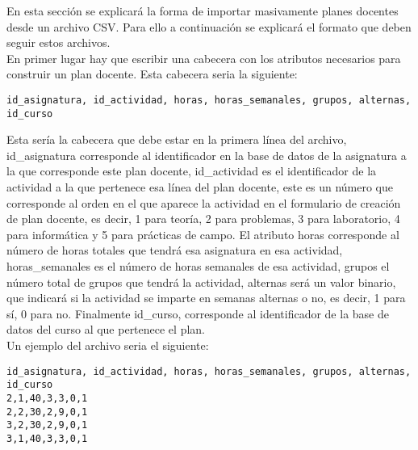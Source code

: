 En esta sección se explicará la forma de importar masivamente planes docentes desde un archivo CSV. Para ello a continuación se explicará el formato que deben seguir estos archivos.
\\
En primer lugar hay que escribir una cabecera con los atributos necesarios para construir un plan docente. Esta cabecera seria la siguiente:

\begin{verbatim}
id_asignatura, id_actividad, horas, horas_semanales, grupos, alternas, id_curso
\end{verbatim}

Esta sería la cabecera que debe estar en la primera línea del archivo, id\_asignatura corresponde al identificador en la base de datos de la asignatura a la que corresponde este plan docente, id\_actividad es el identificador de la actividad a la que pertenece esa línea del plan docente, este es un número que corresponde al orden en el que aparece la actividad en el formulario de creación de plan docente, es decir, 1 para teoría, 2 para problemas, 3 para laboratorio, 4 para informática y 5 para prácticas de campo. El atributo horas corresponde al número de horas totales que tendrá esa asignatura en esa actividad, horas\_semanales es el número de horas semanales de esa actividad, grupos el número total de grupos que tendrá la actividad, alternas será un valor binario, que indicará si la actividad se imparte en semanas alternas o no, es decir, 1 para sí, 0 para no. Finalmente id\_curso, corresponde al identificador de la base de datos del curso al que pertenece el plan.
\\
Un ejemplo del archivo seria el siguiente:

\begin{verbatim}
id_asignatura, id_actividad, horas, horas_semanales, grupos, alternas, id_curso
2,1,40,3,3,0,1
2,2,30,2,9,0,1
3,2,30,2,9,0,1
3,1,40,3,3,0,1
\end{verbatim}
